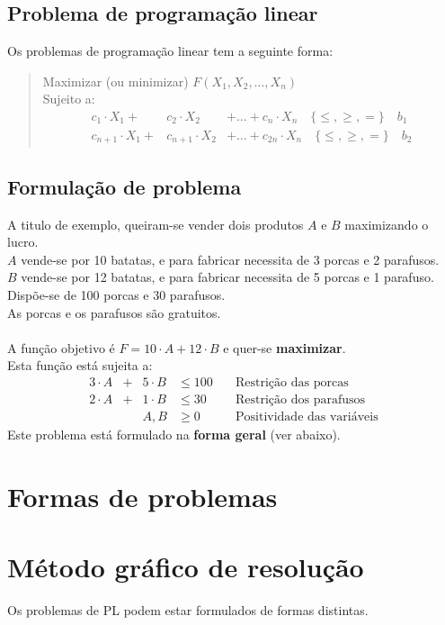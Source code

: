 \documentclass[]{report}
\begin{document}
\subsection{Problema de programação linear}
Os problemas de programação linear tem a seguinte forma:
\begin{quotation}
\noindent
Maximizar (ou minimizar) $F(X_1, X_2, \dots, X_n)$\\
Sujeito a:
$$\begin{array}{rrl}
c_1 \cdot X_1  + & c_2 \cdot X_2 & + \dots + c_n \cdot X_n \quad \{\leq, \geq, =\}\quad b_1\\
c_{n+1} \cdot X_1 + & c_{n+1} \cdot X_2 & + \dots + c_{2n} \cdot X_n \quad \{\leq, \geq, =\}\quad b_2
\end{array}
$$
\end{quotation}
\subsection{Formulação de problema}
A titulo de exemplo, queiram-se vender dois produtos $A$ e $B$ maximizando o lucro.\\
$A$ vende-se por 10 batatas, e para fabricar necessita de 3 porcas e 2 parafusos.\\
$B$ vende-se por 12 batatas, e para fabricar necessita de 5 porcas e 1 parafuso.\\ 
Dispõe-se de 100 porcas e 30 parafusos.\\
As porcas e os parafusos são gratuitos.\\ \\
A função objetivo é $F = 10 \cdot A + 12 \cdot B$ e quer-se \textbf{maximizar}.\\
Esta função está sujeita a:
$$\begin{array}{rccll}
3 \cdot A &+& 5 \cdot B &\leq 100 \quad &\text{Restrição das porcas}\\
2 \cdot A &+& 1 \cdot B &\leq 30 \quad &\text{Restrição dos parafusos}\\
&&A, B& \geq 0& \text{Positividade das variáveis}
\end{array}
$$
Este problema está formulado na \textbf{forma geral} (ver abaixo).
\section{Formas de problemas}
\section{Método gráfico de resolução}
Os problemas de PL podem estar formulados de formas distintas.
\end{document}
